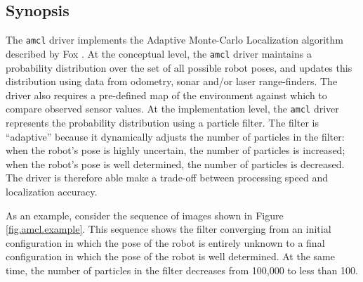 
\subsection*{Synopsis}

The {\tt amcl} driver implements the Adaptive Monte-Carlo
Localization algorithm described by Fox \cite{fox01a}.
%
At the conceptual level, the {\tt amcl} driver maintains a
probability distribution over the set of all possible robot poses, and
updates this distribution using data from odometry, sonar and/or laser
range-finders.  The driver also requires a pre-defined map of the
environment against which to compare observed sensor values.
%
At the implementation level, the {\tt amcl} driver represents
the probability distribution using a particle filter.  The filter is
``adaptive'' because it dynamically adjusts the number of particles in
the filter: when the robot's pose is highly uncertain, the number of
particles is increased; when the robot's pose is well determined, the
number of particles is decreased.  The driver is therefore able make a
trade-off between processing speed and localization accuracy.

As an example, consider the sequence of images shown in Figure
\ref{fig.amcl.example}.  This sequence shows the filter converging
from an initial configuration in which the pose of the robot is
entirely unknown to a final configuration in which the pose of the
robot is well determined.  At the same time, the number of particles
in the filter decreases from 100,000 to less than 100.

